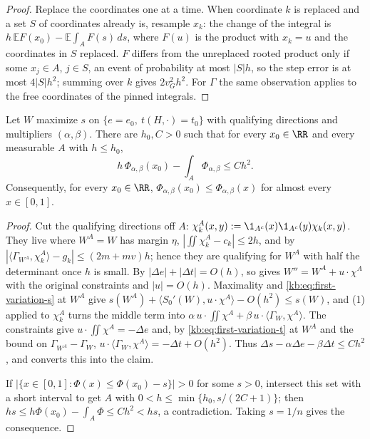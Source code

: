 \begin{proof}
Replace the coordinates one at a time.  When coordinate $k$ is replaced and a set $S$ of
coordinates already is, resample $x_k$: the change of the integral is
$h\,\mathbb E F(x_0)-\mathbb E\int_AF(s)\,ds$, where $F(u)$ is the product with $x_k=u$ and the
coordinates in $S$ replaced.  $F$ differs from the unreplaced rooted product only if some
$x_j\in A$, $j\in S$, an event of probability at most $|S|h$, so the step error is at most
$4|S|h^2$; summing over $k$ gives $2v_G^2h^2$.  For $\Gamma$ the same observation applies to
the free coordinates of the pinned integrals.
\end{proof}

\begin{proposition}\label{kb:lem:row}
Let $W$ maximize $s$ on $\{e=e_0,\ t(H,\cdot)=t_0\}$ with qualifying directions and multipliers
$(\alpha,\beta)$.  There are $h_0,C>0$ such that for every $x_0\in\RR$ and every measurable $A$
with $h\le h_0$,
\[
  h\,\Phi_{\alpha,\beta}(x_0)-\int_A\Phi_{\alpha,\beta}\le Ch^2 .
\]
Consequently, for every $x_0\in\RR$, $\Phi_{\alpha,\beta}(x_0)\le\Phi_{\alpha,\beta}(x)$ for
almost every $x\in[0,1]$.
\end{proposition}

\begin{proof}
Cut the qualifying directions off $A$: $\chi_k^A(x,y):=\1_{A^c}(x)\1_{A^c}(y)\chi_k(x,y)$.  They
live where $W^A=W$ has margin $\eta$, $|\iint\chi_k^A-c_k|\le2h$, and by
 $|\langle\Gamma_{W^A},\chi_k^A\rangle-g_k|\le(2m+mv)h$; hence they
are qualifying for $W^A$ with half the determinant once $h$ is small.  By
 $|\Delta e|+|\Delta t|=O(h)$, so  gives
$W''=W^A+u\cdot\chi^A$ with the original constraints and $|u|=O(h)$.  Maximality and
\eqref{kb:eq:first-variation-s} at $W^A$ give
$s(W^A)+\langle S_0'(W),u\cdot\chi^A\rangle-O(h^2)\le s(W)$, and
(1) applied to $\chi_k^A$ turns the middle term into
$\alpha\,u\cdot\iint\chi^A+\beta\,u\cdot\langle\Gamma_W,\chi^A\rangle$.  The constraints give
$u\cdot\iint\chi^A=-\Delta e$ and, by \eqref{kb:eq:first-variation-t} at $W^A$ and the bound on
$\Gamma_{W^A}-\Gamma_W$, $u\cdot\langle\Gamma_W,\chi^A\rangle=-\Delta t+O(h^2)$.  Thus
$\Delta s-\alpha\Delta e-\beta\Delta t\le Ch^2$, and  converts this
into the claim.

If $|\{x\in[0,1]:\Phi(x)\le\Phi(x_0)-s\}|>0$ for some $s>0$, intersect this set with a short
interval to get $A$ with $0<h\le\min\{h_0,s/(2C+1)\}$; then
$hs\le h\Phi(x_0)-\int_A\Phi\le Ch^2<hs$, a contradiction.  Taking $s=1/n$ gives the
consequence.
\end{proof}


